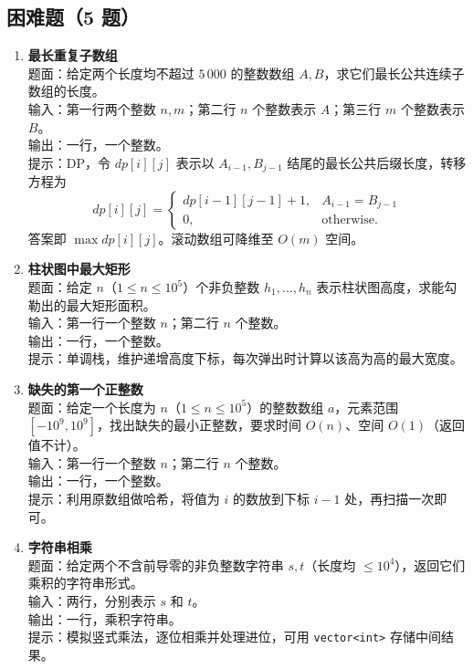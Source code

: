 \documentclass{article}
\begin{document}
\subsection{困难题（5 题）}

\begin{enumerate}[label=\textbf{H\arabic*.}]
  \item \textbf{最长重复子数组}\\
    题面：给定两个长度均不超过 $5\,000$ 的整数数组 $A,B$，求它们最长公共连续子数组的长度。\\
    输入：第一行两个整数 $n,m$；第二行 $n$ 个整数表示 $A$；第三行 $m$ 个整数表示 $B$。\\
    输出：一行，一个整数。\\
    提示：DP，令 $dp[i][j]$ 表示以 $A_{i-1},B_{j-1}$ 结尾的最长公共后缀长度，转移方程为
    $$dp[i][j]=
    \begin{cases}
      dp[i-1][j-1]+1,&A_{i-1}=B_{j-1}\\[2pt]
      0,&\text{otherwise}.
    \end{cases}$$
    答案即 $\max dp[i][j]$。滚动数组可降维至 $O(m)$ 空间。

  \item \textbf{柱状图中最大矩形}\\
    题面：给定 $n$（$1\le n\le 10^5$）个非负整数 $h_1,\dots ,h_n$ 表示柱状图高度，求能勾勒出的最大矩形面积。\\
    输入：第一行一个整数 $n$；第二行 $n$ 个整数。\\
    输出：一行，一个整数。\\
    提示：单调栈，维护递增高度下标，每次弹出时计算以该高为高的最大宽度。

  \item \textbf{缺失的第一个正整数}\\
    题面：给定一个长度为 $n$（$1\le n\le 10^5$）的整数数组 $a$，元素范围 $[-10^9,10^9]$，找出缺失的最小正整数，要求时间 $O(n)$、空间 $O(1)$（返回值不计）。\\
    输入：第一行一个整数 $n$；第二行 $n$ 个整数。\\
    输出：一行，一个整数。\\
    提示：利用原数组做哈希，将值为 $i$ 的数放到下标 $i-1$ 处，再扫描一次即可。

  \item \textbf{字符串相乘}\\
    题面：给定两个不含前导零的非负整数字符串 $s,t$（长度均 $\le 10^4$），返回它们乘积的字符串形式。\\
    输入：两行，分别表示 $s$ 和 $t$。\\
    输出：一行，乘积字符串。\\
    提示：模拟竖式乘法，逐位相乘并处理进位，可用 \texttt{vector<int>} 存储中间结果。


\end{enumerate}
\end{document}
